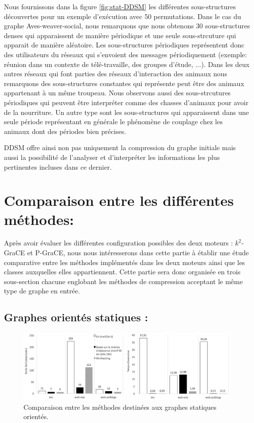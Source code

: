 	Nous fournissons dans la figure \ref{fig:stat-DDSM} les différentes sous-structures découvertes pour un exemple d'exécution avec 50 permutations. Dans le cas du graphe Aves-weaver-social, nous remarquons que nous obtenons 30 sous-structures denses qui apparaissent de manière périodique et une seule sous-strcuture qui apparait de manière aléatoire. Les sous-structures périodiques représentent donc des utilisateurs du réseaux qui s'envoient des messages  périodiquement (exemple: réunion dans un contexte de télé-travaille, des groupes d'étude, ...). Dans les deux autres réseaux qui font parties des réseaux d'interaction des animaux nous remarquons des sous-structures constantes qui représente peut être des animaux appartenant à un même troupeau. Nous observons aussi des sous-strcutures périodiques qui peuvent être interpréter comme des chasses d'animaux pour avoir de la nourriture. Un autre type sont les sous-structures qui apparaissent dans une seule période représentant en générale le phénomène de couplage chez les animaux dont des périodes bien précises.
	
	DDSM offre ainsi non pas uniquement la compression du graphe initiale mais aussi la possibilité de l'analyser et d'interpréter les informations les plus pertinentes incluses dans ce dernier.
	
	\section{Comparaison entre les différentes méthodes:}
	
	Après avoir évaluer les différentes configuration possibles des deux moteurs : $k^2$-GraCE et P-GraCE, nous nous intéresserons dans cette partie à établir une étude comparative entre les méthodes implémentés dans les deux moteurs ainsi que les classes auxquelles elles appartiennent. Cette partie sera donc organisée en trois sous-section chacune englobant les méthodes de compression acceptant le même type de graphe en entrée.
	
	\subsection{Graphes orientés statiques :}
\begin{figure}[H]
		\begin{center}
		 \includegraphics[scale=0.4]{ressources/image/compNon.png}
			
			
			\caption{Comparaison entre les méthodes destinées aux graphes statiques orientés.}
			\label{fig:comp-dyn}
		\end{center}
	\end{figure}	
	
